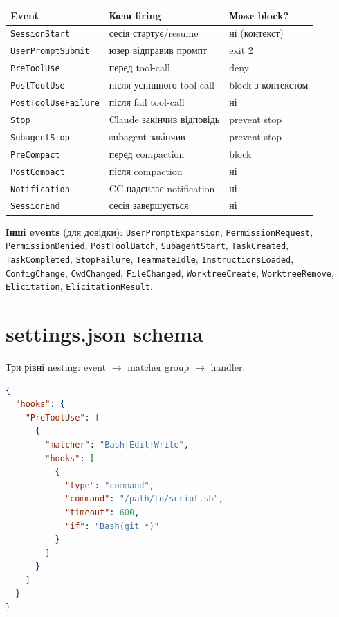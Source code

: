\documentclass[11pt,a4paper]{article}
\begin{document}
\begin{tabular}{lll}
\hline
\textbf{Event} & \textbf{Коли firing} & \textbf{Може block?} \\
\hline
\texttt{SessionStart} & сесія стартує/resume & ні (контекст) \\
\texttt{UserPromptSubmit} & юзер відправив промпт & exit 2 \\
\texttt{PreToolUse} & перед tool-call & deny \\
\texttt{PostToolUse} & після успішного tool-call & block з контекстом \\
\texttt{PostToolUseFailure} & після fail tool-call & ні \\
\texttt{Stop} & Claude закінчив відповідь & prevent stop \\
\texttt{SubagentStop} & subagent закінчив & prevent stop \\
\texttt{PreCompact} & перед compaction & block \\
\texttt{PostCompact} & після compaction & ні \\
\texttt{Notification} & CC надсилає notification & ні \\
\texttt{SessionEnd} & сесія завершується & ні \\
\hline
\end{tabular}

\textbf{Інші events} (для довідки): \texttt{UserPromptExpansion}, \texttt{PermissionRequest}, \texttt{PermissionDenied}, \texttt{PostToolBatch}, \texttt{SubagentStart}, \texttt{TaskCreated}, \texttt{TaskCompleted}, \texttt{StopFailure}, \texttt{TeammateIdle}, \texttt{InstructionsLoaded}, \texttt{ConfigChange}, \texttt{CwdChanged}, \texttt{FileChanged}, \texttt{WorktreeCreate}, \texttt{WorktreeRemove}, \texttt{Elicitation}, \texttt{ElicitationResult}.

\section{settings.json schema}

Три рівні nesting: event $\to$ matcher group $\to$ handler.

\begin{lstlisting}[language=json]
{
  "hooks": {
    "PreToolUse": [
      {
        "matcher": "Bash|Edit|Write",
        "hooks": [
          {
            "type": "command",
            "command": "/path/to/script.sh",
            "timeout": 600,
            "if": "Bash(git *)"
          }
        ]
      }
    ]
  }
}
\end{lstlisting}
\end{document}
